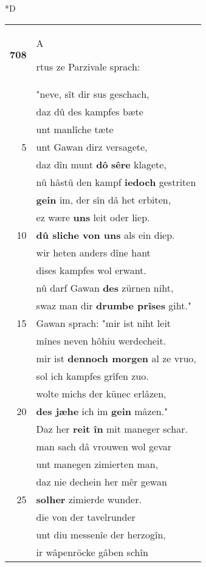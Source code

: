 \documentclass[8pt,a4paper,notitlepage]{article}
\begin{document}
\begin{table}[ht]
\begin{minipage}[t]{0.5\linewidth}
\small
\begin{center}*D
\end{center}
\begin{tabular}{rl}
\textbf{708} & \begin{large}A\end{large}rtus ze Parzivale sprach:\\ 
 & "neve, sît dir sus geschach,\\ 
 & daz dû des kampfes bæte\\ 
 & unt manlîche tæte\\ 
5 & unt Gawan dirz versagete,\\ 
 & daz dîn munt \textbf{dô} \textbf{sêre} klagete,\\ 
 & nû hâstû den kampf \textbf{iedoch} gestriten\\ 
 & \textbf{gein} im, der sîn dâ het erbiten,\\ 
 & ez wære \textbf{uns} leit oder liep.\\ 
10 & \textbf{dû sliche von uns} als ein diep.\\ 
 & wir heten anders dîne hant\\ 
 & dises kampfes wol erwant.\\ 
 & nû darf Gawan \textbf{des} zürnen niht,\\ 
 & swaz man dir \textbf{drumbe prîses} giht."\\ 
15 & Gawan sprach: "mir ist niht leit\\ 
 & mînes neven hôhiu werdecheit.\\ 
 & mir ist \textbf{dennoch morgen} al ze vruo,\\ 
 & sol ich kampfes grîfen zuo.\\ 
 & wolte michs der künec erlâzen,\\ 
20 & \textbf{des jæhe} ich im \textbf{gein} mâzen."\\ 
 & Daz her \textbf{reit în} mit maneger schar.\\ 
 & man sach dâ vrouwen wol gevar\\ 
 & unt manegen zimierten man,\\ 
 & daz nie dechein her mêr gewan\\ 
25 & \textbf{solher} zimierde wunder.\\ 
 & die von der tavelrunder\\ 
 & unt diu messenîe der herzogîn,\\ 
 & ir wâpenröcke gâben schîn\\ 

\end{tabular}
\end{minipage}
\end{table}
\end{document}
